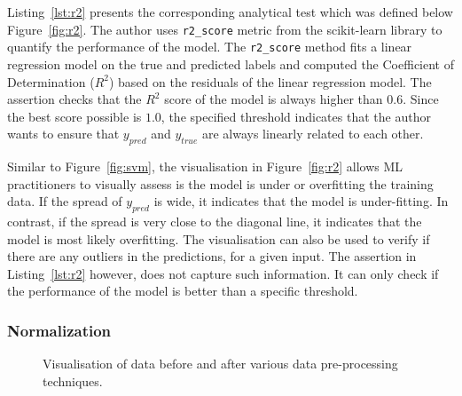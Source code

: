 \documentclass[conference]{IEEEtran}
\begin{document}
Listing~\ref{lst:r2} presents the corresponding analytical test which was defined below Figure~\ref{fig:r2}. The author uses \texttt{r2\_score} metric from the scikit-learn library to quantify the performance of the model. The \texttt{r2\_score} method fits a linear regression model on the true and predicted labels and computed the Coefficient of Determination ($R^2$) based on the residuals of the linear regression model. The assertion checks that the $R^2$ score of the model is always higher than $0.6$. Since the best score possible is $1.0$, the specified threshold indicates that the author wants to ensure that $y_{pred}$ and $y_{true}$ are always linearly related to each other.

Similar to Figure~\ref{fig:svm}, the visualisation in Figure~\ref{fig:r2} allows ML practitioners to visually assess is the model is under or overfitting the training data. If the spread of $y_{pred}$ is wide, it indicates that the model is under-fitting. In contrast, if the spread is very close to the diagonal line, it indicates that the model is most likely overfitting. The visualisation can also be used to verify if there are any outliers in the predictions, for a given input. The assertion in Listing~\ref{lst:r2} however, does not capture such information. It can only check if the performance of the model is better than a specific threshold.

\subsubsection{Normalization}

\begin{figure}
  \caption{Visualisation of data before and after various data pre-processing techniques.}
  \label{fig:data-pre-process}
\end{figure}
\end{document}
